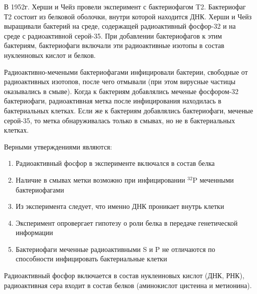 
В 1952г. Херши и Чейз провели
эксперимент с  бактериофагом T2.
Бактериофаг Т2 состоит из белковой оболочки, внутри которой находится ДНК.
Херши и Чейз выращивали бактерий на среде, содержащей радиоактивный фосфор-32 и
на среде с радиоактивной серой-35. При добавлении бактериофагов к этим
бактериям, бактериофаги включали эти радиоактивные изотопы в состав нуклеиновых
кислот и белков. 

Радиоактивно-мечеными
бактериофагами инфицировали бактерии, свободные от радиоактивных изотопов,
после чего отмывали (при этом вирусные частицы оказывались в смыве). Когда к
бактериям добавлялись меченые фосфором-32 бактериофаги, радиоактивная метка
после инфицирования находилась в бактериальных клетках. Если же к бактериям
добавлялись бактериофаги, меченые серой-35, то метка обнаруживалась только в
смывах, но не в бактериальных клетках.


Верными утверждениями являются:

\begin{enumerate}
    \item Радиоактивный фосфор в эксперименте включался в состав белка
    \item Наличие в смывах метки возможно при инфицировании $^{32}$P меченными бактериофагами
    \item Из эксперимента следует, что именно ДНК проникает внутрь клетки
    \item Эксперимент опровергает гипотезу о роли белка в передаче генетической информации
    \item Бактериофаги меченные радиоактивными S и P не отличаются по способности инфицировать бактериальные клетки
\end{enumerate}

\explanationSection

Радиоактивный фосфор включается в состав нуклеиновых кислот (ДНК, РНК), радиоактивная сера входит 
в состав белков (аминокислот цистеина и метионина).

